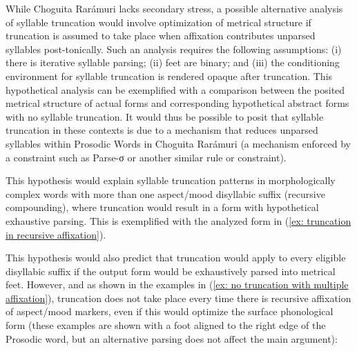While Choguita Rarámuri lacks secondary stress, a possible alternative analysis of syllable truncation would involve optimization of metrical structure if truncation is assumed to take place when affixation contributes unparsed syllables post-tonically. Such an analysis requires the following assumptions: (i) there is iterative syllable parsing; (ii) feet are binary; and (iii) the conditioning environment for syllable truncation is rendered opaque after truncation. This hypothetical analysis can be exemplified with a comparison between the posited metrical structure of actual forms and corresponding hypothetical abstract forms with no syllable truncation. It would thus be possible to posit that syllable truncation in these contexts is due to a mechanism that reduces unparsed syllables within Prosodic Words in Choguita Rarámuri (a mechanism enforced by a constraint such as Parse-σ or another similar rule or constraint).

This hypothesis would explain syllable truncation patterns in morphologically complex words with more than one aspect/mood disyllabic suffix (recursive compounding), where truncation would result in a form with hypothetical exhaustive parsing. This is exemplified with the analyzed form in (\ref{ex: truncation in recursive affixation}).

\ea\label{ex: truncation in recursive affixation}

    \ea[]{
    \glt /uba-simi-tʃ͡ane/ 		→	(uˈba-s)\textsubscript{Ft}-(tʃ͡ani)\textsubscript{Ft}]\textsubscript{PrWd}\\
            bathe-\textsc{mot-ev}\\
    \glt    `It sounds like they are going along bathing.'\\
    \glt    ‘Suena que se van bañando.’\\
}
    \z
\z

This hypothesis would also predict that truncation would apply to every eligible disyllabic suffix if the output form would be exhaustively parsed into metrical feet. However, and as shown in the examples in (\ref{ex: no truncation with multiple affixation}), truncation does not take place every time there is recursive affixation of aspect/mood markers, even if this would optimize the surface phonological form (these examples are shown with a foot aligned to the right edge of the Prosodic word, but an alternative parsing does not affect the main argument):

